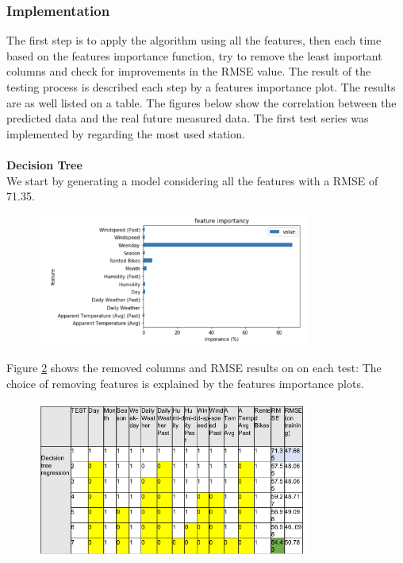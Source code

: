 \subsubsection{Implementation}\label{sec:sparkimpl}
The first step is to apply the algorithm using all the features, then each time based on the
features importance function, try to remove the least important columns and check for
improvements in the RMSE value.
The result of the testing process is described each step by a features importance plot. The
results are as well listed on a table.
The figures below show the correlation between the predicted data and the real future
measured data. The first test series was implemented by regarding the most used station.\\\\
\textbf{Decision Tree}\\
We start by generating a model considering all the features with a RMSE of 71.35.
\begin{figure}[H]
\centering
\includegraphics[width=0.8\textwidth]{media/test1_dt}\label{fig:test1_dt}
\label{fig:test1_dt}
\end{figure}
Figure \ref{fig:anasst1} shows the removed columns and RMSE results on on each test:
The choice of removing features is explained by the features importance plots.
\begin{figure}[H]
\centering
\includegraphics[width=0.8\textwidth]{media/anasst1}\label{fig:anasst1}
\label{fig:anasst1}
\end{figure}
